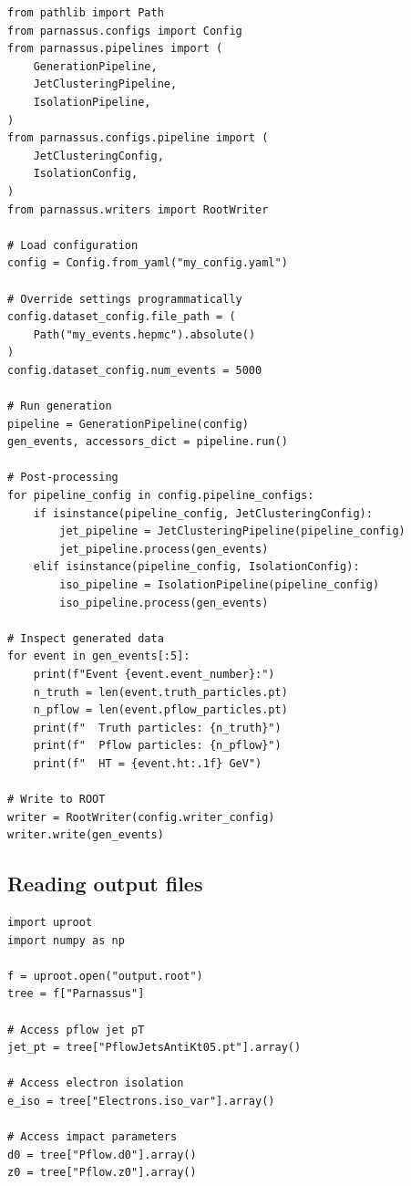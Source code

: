 \documentclass[11pt,a4paper]{article}          %
\begin{document}
\begin{lstlisting}[style=python,caption={Programmatic usage of the generation pipeline.}]
from pathlib import Path
from parnassus.configs import Config
from parnassus.pipelines import (
    GenerationPipeline,
    JetClusteringPipeline,
    IsolationPipeline,
)
from parnassus.configs.pipeline import (
    JetClusteringConfig,
    IsolationConfig,
)
from parnassus.writers import RootWriter

# Load configuration
config = Config.from_yaml("my_config.yaml")

# Override settings programmatically
config.dataset_config.file_path = (
    Path("my_events.hepmc").absolute()
)
config.dataset_config.num_events = 5000

# Run generation
pipeline = GenerationPipeline(config)
gen_events, accessors_dict = pipeline.run()

# Post-processing
for pipeline_config in config.pipeline_configs:
    if isinstance(pipeline_config, JetClusteringConfig):
        jet_pipeline = JetClusteringPipeline(pipeline_config)
        jet_pipeline.process(gen_events)
    elif isinstance(pipeline_config, IsolationConfig):
        iso_pipeline = IsolationPipeline(pipeline_config)
        iso_pipeline.process(gen_events)

# Inspect generated data
for event in gen_events[:5]:
    print(f"Event {event.event_number}:")
    n_truth = len(event.truth_particles.pt)
    n_pflow = len(event.pflow_particles.pt)
    print(f"  Truth particles: {n_truth}")
    print(f"  Pflow particles: {n_pflow}")
    print(f"  HT = {event.ht:.1f} GeV")

# Write to ROOT
writer = RootWriter(config.writer_config)
writer.write(gen_events)
\end{lstlisting}

\subsection{Reading output files}

\begin{lstlisting}[style=python,caption={Reading the output ROOT file with \texttt{uproot}.}]
import uproot
import numpy as np

f = uproot.open("output.root")
tree = f["Parnassus"]

# Access pflow jet pT
jet_pt = tree["PflowJetsAntiKt05.pt"].array()

# Access electron isolation
e_iso = tree["Electrons.iso_var"].array()

# Access impact parameters
d0 = tree["Pflow.d0"].array()
z0 = tree["Pflow.z0"].array()
\end{lstlisting}
\end{document}

